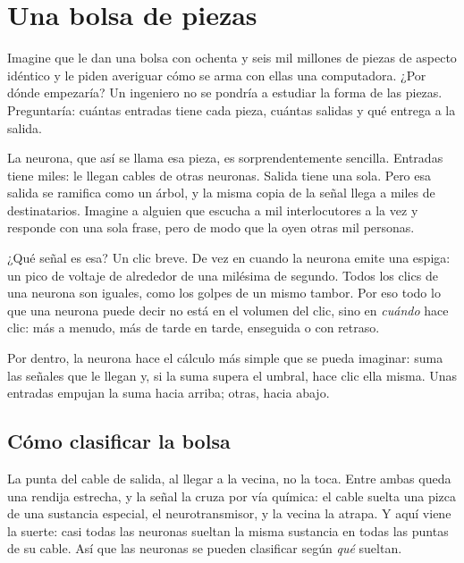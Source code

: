 \chapter{Una bolsa de piezas}


Imagine que le dan una bolsa con ochenta y seis mil millones de piezas de aspecto idéntico y le piden averiguar cómo se arma con ellas una computadora. ¿Por dónde empezaría? Un ingeniero no se pondría a estudiar la forma de las piezas. Preguntaría: cuántas entradas tiene cada pieza, cuántas salidas y qué entrega a la salida.

La neurona, que así se llama esa pieza, es sorprendentemente sencilla. Entradas tiene miles: le llegan cables de otras neuronas. Salida tiene una sola. Pero esa salida se ramifica como un árbol, y la misma copia de la señal llega a miles de destinatarios. Imagine a alguien que escucha a mil interlocutores a la vez y responde con una sola frase, pero de modo que la oyen otras mil personas.

¿Qué señal es esa? Un clic breve. De vez en cuando la neurona emite una espiga: un pico de voltaje de alrededor de una milésima de segundo. Todos los clics de una neurona son iguales, como los golpes de un mismo tambor. Por eso todo lo que una neurona puede decir no está en el volumen del clic, sino en \emph{cuándo} hace clic: más a menudo, más de tarde en tarde, enseguida o con retraso.

Por dentro, la neurona hace el cálculo más simple que se pueda imaginar: suma las señales que le llegan y, si la suma supera el umbral, hace clic ella misma. Unas entradas empujan la suma hacia arriba; otras, hacia abajo.

\section*{Cómo clasificar la bolsa}

La punta del cable de salida, al llegar a la vecina, no la toca. Entre ambas queda una rendija estrecha, y la señal la cruza por vía química: el cable suelta una pizca de una sustancia especial, el neurotransmisor, y la vecina la atrapa. Y aquí viene la suerte: casi todas las neuronas sueltan la misma sustancia en todas las puntas de su cable. Así que las neuronas se pueden clasificar según \emph{qué} sueltan.

